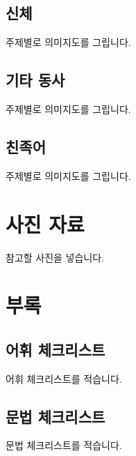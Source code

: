 \documentclass{snu-fl-questionnaire}
\begin{document}
\section{신체}
주제별로 의미지도를 그립니다.

\section{기타 동사}
주제별로 의미지도를 그립니다.

\section{친족어}
주제별로 의미지도를 그립니다.

\chapter{사진 자료}
참고할 사진을 넣습니다.


\chapter*{부록}
\begin{appendices}

\section{어휘 체크리스트}
어휘 체크리스트를 적습니다.

\section{문법 체크리스트}
문법 체크리스트를 적습니다.

\end{appendices}


\backmatter
\makebackcover
\end{document}
